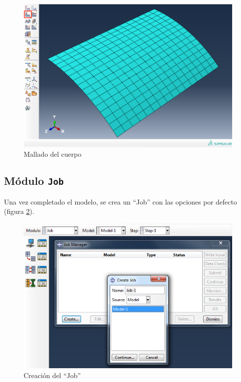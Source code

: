 \documentclass[spanish,a4paper,12pt]{article}
\begin{document}
\begin{figure}[h!tp]
\centering
\includegraphics[scale=0.30]{capturas/36-mesh-x.png}
\caption{Mallado del cuerpo}
\label{fig:mesh}
\end{figure}

\subsection{Módulo \texttt{Job}}

Una vez completado el modelo, se crea un ``Job'' con las opciones por defecto
(figura \ref{fig:job-create}).
\begin{figure}[h!tp]
\centering
\includegraphics[scale=0.5]{capturas/37-job.png}
\caption{Creación del ``Job''}
\label{fig:job-create}
\end{figure}
\end{document}
